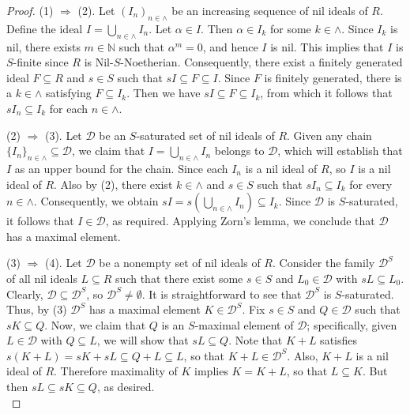 \documentclass[11pt]{article}
\begin{document}
\begin{proof}
	\leavevmode
	
	\item(1) $\Rightarrow$ (2). Let $(I_n)_{n\in\wedge}$ be an increasing sequence of nil ideals of $R$. Define the ideal $I = \bigcup\limits_{n\in\wedge}I_n$. Let $\alpha\in I$. Then $\alpha\in I_{k}$ for some $k\in\wedge$. Since $I_{k}$ is nil, there exists $m\in\mathbb{N}$ such that $\alpha^{m}=0$, and hence $I$ is nil. This implies that $I$ is $S$-finite since $R$ is Nil-$S$-Noetherian. Consequently, there exist a finitely  generated ideal $F\subseteq R$ and $s\in S$ such that $sI\subseteq F\subseteq I$. Since $F$ is finitely generated, there is a $k\in\wedge$ satisfying $F\subseteq I_{k}$. Then we have $sI\subseteq F\subseteq I_{k}$, from which it follows that $sI_n \subseteq I_{k}$ for each $n\in\wedge$.\\
	
	\item (2) $\Rightarrow$ (3).  Let $\mathcal{D}$ be an $S$-saturated set of nil ideals of $R$. Given any chain \(\{I_n\}_{n \in\wedge} \subseteq \mathcal{D} \), we claim that \( I = \bigcup\limits_{n\in\wedge} I_n \) belongs to $\mathcal{D}$, which will establish that \( I \) as an upper bound for the chain. Since each $I_n$ is a nil ideal of $R$, so $I$ is a nil ideal of $R$. Also by (2), there exist \( k \in \wedge \) and \( s \in S \) such that \( s I_n \subseteq I_k \) for every \( n \in \wedge \). Consequently, we obtain $sI = s \left(\bigcup\limits_{n\in\wedge} I_n \right) \subseteq I_k$. Since $\mathcal{D}$ is $S$-saturated, it follows that \( I \in \mathcal{D} \), as required. Applying Zorn's lemma, we conclude that $\mathcal{D}$ has a maximal element.\\
	
	\item (3) $\Rightarrow$ (4). Let $\mathcal{D}$ be a nonempty set of nil ideals of $R$. Consider the family $\mathcal{D}^{S}$ of all nil ideals $L \subseteq R$ such that there exist some $s\in S$ and $L_0 \in \mathcal{D}$ with $sL \subseteq L_0$. Clearly, $\mathcal{D}\subseteq \mathcal{D}^{S}$, so $\mathcal{D}^{S}\neq\emptyset$. It is straightforward to see that $\mathcal{D}^{S}$ is $S$-saturated. Thus, by (3) $\mathcal{D}^{S}$ has a maximal element $K\in\mathcal{D}^{S}$. Fix $s \in S$ and $Q\in \mathcal{D}$ such that $sK\subseteq Q$. Now, we claim that $Q$ is an $S$-maximal element of $\mathcal{D}$; specifically, given $L\in \mathcal{D}$ with $Q\subseteq L$, we will show that $sL \subseteq Q$. Note that $K + L$ satisfies $s(K + L)= sK + sL \subseteq Q + L \subseteq L$, so that $K + L \in \mathcal{D}^{S}$. Also,  $K+L$ is a nil ideal of $R$. Therefore maximality of $K$ implies $K = K + L$, so that $L \subseteq K$. But then $sL \subseteq sK \subseteq Q$, as desired.\\
	

\end{proof}
\end{document}
